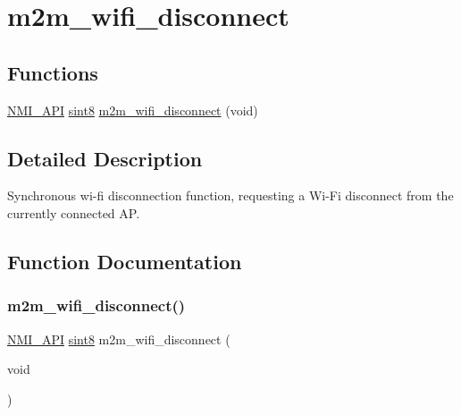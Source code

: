 \hypertarget{group__WifiDisconnectFn}{}\section{m2m\+\_\+wifi\+\_\+disconnect}
\label{group__WifiDisconnectFn}
\subsection*{Functions}
\begin{DoxyCompactItemize}
\item 
\hyperlink{group__BSPDefine_gaecc0323d771e41ef81a76b5f12783e22}{N\+M\+I\+\_\+\+A\+PI} \hyperlink{group__DataT_gae35f10ffd0ac8dd2bc3e794da9bdfbc7}{sint8} \hyperlink{group__WifiDisconnectFn_gac8b0100ec59a1b0852e4801f6879120f}{m2m\+\_\+wifi\+\_\+disconnect} (void)
\end{DoxyCompactItemize}


\subsection{Detailed Description}
Synchronous wi-\/fi disconnection function, requesting a Wi-\/\+Fi disconnect from the currently connected AP. 

\subsection{Function Documentation}
\mbox{\label{group__WifiDisconnectFn_gac8b0100ec59a1b0852e4801f6879120f}} 
\subsubsection{\texorpdfstring{m2m\+\_\+wifi\+\_\+disconnect()}{m2m\_wifi\_disconnect()}}
{\footnotesize\ttfamily \hyperlink{group__BSPDefine_gaecc0323d771e41ef81a76b5f12783e22}{N\+M\+I\+\_\+\+A\+PI} \hyperlink{group__DataT_gae35f10ffd0ac8dd2bc3e794da9bdfbc7}{sint8} m2m\+\_\+wifi\+\_\+disconnect (\begin{DoxyParamCaption}\item[{void}]{ }\end{DoxyParamCaption})}



